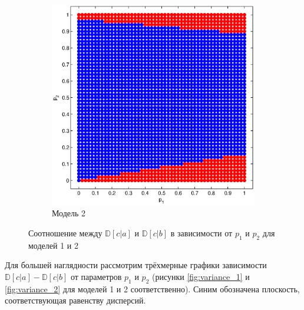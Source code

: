 \documentclass[12pt,a4paper,oneside,fleqn,leqno]{article}
\begin{document}
\begin{figure}[H]
\begin{subfigure}[b]{0.5\textwidth}
					\includegraphics[width=1.0\textwidth]{variance_binary_2.eps}
					\caption{Модель 2}
					\label{fig:variance_binary_2}
				\end{subfigure}
				\captionsetup{justification=centering}
				\caption{Соотношение между $\mathbb{D}[c|a]$ и $\mathbb{D}[c|b]$ в зависимости от $p_1$ и $p_2$ для моделей 1 и 2}
				\label{fig:distr_c_d}
			\end{figure}
\par
			Для большей наглядности рассмотрим трёхмерные графики зависимости $\mathbb{D}[c|a] - \mathbb{D}[c|b]$ от параметров $p_1$ и $p_2$ (рисунки \ref{fig:variance_1} и \ref{fig:variance_2} для моделей 1 и 2 соответственно). Синим обозначена плоскость, соответствующая равенству дисперсий.
\end{document}
